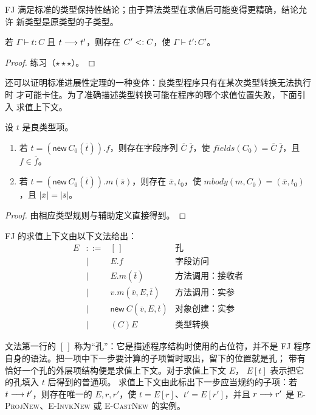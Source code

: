 FJ 满足标准的类型保持性结论；由于算法类型在求值后可能变得更精确，结论允许
新类型是原类型的子类型。

\begin{theorem}[保持性]
\label{thm:19.5.1}
若 \(\Gamma\vdash t:C\) 且 \(t\mathrel{\longrightarrow} t'\)，则存在
\(C'\mathrel{<:} C\)，使 \(\Gamma\vdash t':C'\)。
\end{theorem}
\begin{proof}
练习（\(\star\star\star\)）。
\end{proof}

还可以证明标准进展性定理的一种变体：良类型程序只有在某次类型转换无法执行时
才可能卡住。为了准确描述类型转换可能在程序的哪个求值位置失败，下面引入
求值上下文。

\begin{lemma}
\label{lem:19.5.2}
设 \(t\) 是良类型项。
\begin{enumerate}
\item 若 \(t=(\mathsf{new}\ C_0(\overline t)).f\)，则存在字段序列
  \(\overline C\ \overline f\)，使
  \(\mathit{fields}(C_0)=\overline C\ \overline f\)，且
  \(f\in\overline f\)。
\item 若
  \(t=(\mathsf{new}\ C_0(\overline t)).m(\overline s)\)，则存在
  \(\overline x,t_0\)，使
  \(\mathit{mbody}(m,C_0)=(\overline x,t_0)\)，且
  \(|\overline x|=|\overline s|\)。
\end{enumerate}
\end{lemma}
\begin{proof}
由相应类型规则与辅助定义直接得到。
\end{proof}

\begin{definition}
\label{def:19.5.3}
FJ 的求值上下文由以下文法给出：
\[
\begin{array}{rcll}
E&::=&[\,]&\text{孔}\\
 &\mid&E.f&\text{字段访问}\\
 &\mid&E.m(\overline t)&\text{方法调用：接收者}\\
 &\mid&v.m(\overline v,E,\overline t)&\text{方法调用：实参}\\
 &\mid&\mathsf{new}\ C(\overline v,E,\overline t)&\text{对象创建：实参}\\
 &\mid&(C)E&\text{类型转换}
\end{array}
\]
\end{definition}

文法第一行的 \([\,]\) 称为“孔”：它是描述程序结构时使用的占位符，并不是
FJ 程序自身的语法。把一项中下一步要计算的子项暂时取出，留下的位置就是孔；
带有恰好一个孔的外层项结构便是求值上下文。对于求值上下文 \(E\)，
\(E[t]\) 表示把它的孔填入 \(t\) 后得到的普通项。
求值上下文由此标出下一步应当规约的子项：若
\(t\mathrel{\longrightarrow} t'\)，则存在唯一的 \(E,r,r'\)，使
\(t=E[r]\)、\(t'=E[r']\)，并且 \(r\mathrel{\longrightarrow} r'\) 是
\textsc{E-ProjNew}、\textsc{E-InvkNew} 或 \textsc{E-CastNew} 的实例。

